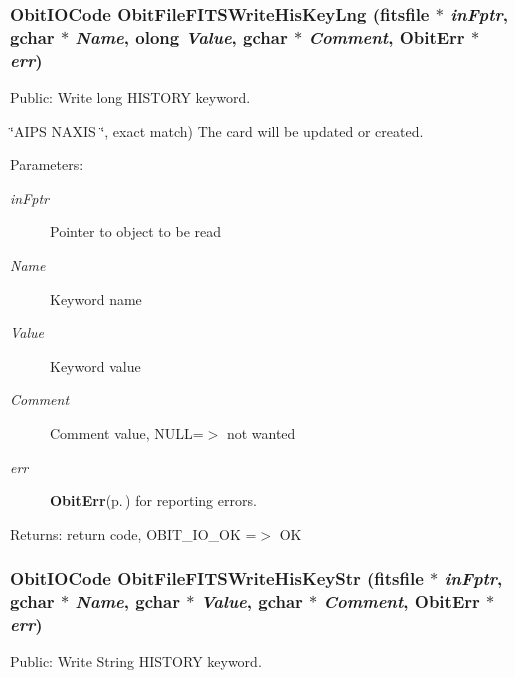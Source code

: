 \subsubsection{\setlength{\rightskip}{0pt plus 5cm}Obit\-IOCode Obit\-File\-FITSWrite\-His\-Key\-Lng (fitsfile $\ast$ {\em in\-Fptr}, gchar $\ast$ {\em Name}, {\bf olong} {\em Value}, gchar $\ast$ {\em Comment}, {\bf Obit\-Err} $\ast$ {\em err})}\label{ObitFileFITS_8h_a26}


Public: Write long HISTORY keyword. 

\char`\"{}AIPS   NAXIS   \char`\"{}, exact match) The card will be updated or created. \begin{Desc}
\item[Parameters:]
\begin{description}
\item[{\em in\-Fptr}]Pointer to object to be read \item[{\em Name}]Keyword name \item[{\em Value}]Keyword value \item[{\em Comment}]Comment value, NULL=$>$ not wanted \item[{\em err}]{\bf Obit\-Err}{\rm (p.\,\pageref{structObitErr})} for reporting errors. \end{description}
\end{Desc}
\begin{Desc}
\item[Returns:]return code, OBIT\_\-IO\_\-OK =$>$ OK \end{Desc}
\subsubsection{\setlength{\rightskip}{0pt plus 5cm}Obit\-IOCode Obit\-File\-FITSWrite\-His\-Key\-Str (fitsfile $\ast$ {\em in\-Fptr}, gchar $\ast$ {\em Name}, gchar $\ast$ {\em Value}, gchar $\ast$ {\em Comment}, {\bf Obit\-Err} $\ast$ {\em err})}\label{ObitFileFITS_8h_a23}


Public: Write String HISTORY keyword. 

